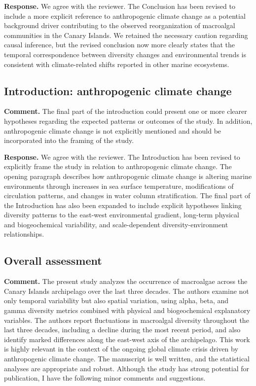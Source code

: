 \documentclass[12pt]{article}
\newcommand{\reviewercomment}[1]{%
\vspace{0.3em}
\noindent\textbf{Comment.} \textcolor{commentblue}{#1}\par
}
\newcommand{\authorresponse}[1]{%
\vspace{0.3em}
\noindent\textbf{Response.} \textcolor{responsegreen}{#1}\par
\vspace{0.8em}
}
\begin{document}
\authorresponse{We agree with the reviewer. The Conclusion has been revised to include a more explicit reference to anthropogenic climate change as a potential background driver contributing to the observed reorganization of macroalgal communities in the Canary Islands. We retained the necessary caution regarding causal inference, but the revised conclusion now more clearly states that the temporal correspondence between diversity changes and environmental trends is consistent with climate-related shifts reported in other marine ecosystems.}

\subsection{Introduction: anthropogenic climate change}

\reviewercomment{The final part of the introduction could present one or more clearer hypotheses regarding the expected patterns or outcomes of the study. In addition, anthropogenic climate change is not explicitly mentioned and should be incorporated into the framing of the study.}

\authorresponse{We agree with the reviewer. The Introduction has been revised to explicitly frame the study in relation to anthropogenic climate change. The opening paragraph describes how anthropogenic climate change is altering marine environments through increases in sea surface temperature, modifications of circulation patterns, and changes in water column stratification. The final part of the Introduction has also been expanded to include explicit hypotheses linking diversity patterns to the east-west environmental gradient, long-term physical and biogeochemical variability, and scale-dependent diversity-environment relationships.}

\subsection{Overall assessment}

\reviewercomment{The present study analyzes the occurrence of macroalgae across the Canary Islands archipelago over the last three decades. The authors examine not only temporal variability but also spatial variation, using alpha, beta, and gamma diversity metrics combined with physical and biogeochemical explanatory variables. The authors report fluctuations in macroalgal diversity throughout the last three decades, including a decline during the most recent period, and also identify marked differences along the east-west axis of the archipelago. This work is highly relevant in the context of the ongoing global climate crisis driven by anthropogenic climate change. The manuscript is well written, and the statistical analyses are appropriate and robust. Although the study has strong potential for publication, I have the following minor comments and suggestions.}
\end{document}
